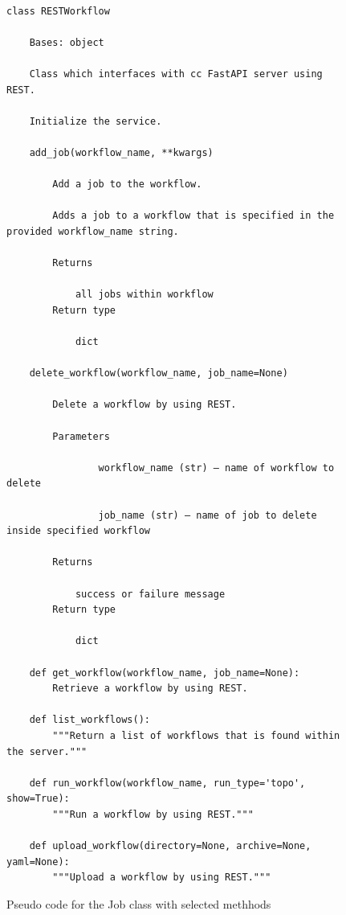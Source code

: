 \begin{figure}[htb]
\caption{Pseudo code for the Job class with selected methhods}
\label{fig:code-workflow-rest}
\begin{verbatim}

class RESTWorkflow

    Bases: object

    Class which interfaces with cc FastAPI server using REST.

    Initialize the service.

    add_job(workflow_name, **kwargs)

        Add a job to the workflow.

        Adds a job to a workflow that is specified in the provided workflow_name string.

        Returns

            all jobs within workflow
        Return type

            dict

    delete_workflow(workflow_name, job_name=None)

        Delete a workflow by using REST.

        Parameters

                workflow_name (str) – name of workflow to delete

                job_name (str) – name of job to delete inside specified workflow

        Returns

            success or failure message
        Return type

            dict

    def get_workflow(workflow_name, job_name=None):
        Retrieve a workflow by using REST.

    def list_workflows():
        """Return a list of workflows that is found within the server."""

    def run_workflow(workflow_name, run_type='topo', show=True):
        """Run a workflow by using REST."""

    def upload_workflow(directory=None, archive=None, yaml=None):
        """Upload a workflow by using REST."""
\end{verbatim}
\end{figure}

